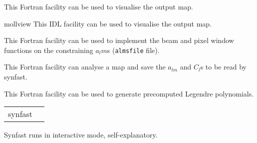 \begin{support}
  \begin{sulist}{} %
  \item[\htmlref{map2gif}{fac:map2gif}] This \healpix Fortran facility can be used to visualise the
  output map.
  \item[mollview] This \healpix IDL facility can be used to visualise the
  output map.
  \item[\htmlref{alteralm}{fac:alteralm}] This \healpix Fortran facility can be
  used to implement the beam and pixel window functions on the constraining
  $a_lm$s ({\tt almsfile} file).
  \item[\htmlref{anafast}{fac:anafast}] This \healpix Fortran facility can analyse a \healpix map and 
     	       save the $a_{lm}$ and $C_l$s to be read by synfast.
  \item[\htmlref{plmgen}{fac:plmgen}] This \healpix Fortran facility can be used to generate precomputed Legendre polynomials.
		
  \end{sulist}
\end{support}

\begin{examples}{1}
{
\begin{tabular}{ll} %
synfast  \\
\end{tabular}
}
{
Synfast runs in interactive mode, self-explanatory.
}
\end{examples}

\vfill\newpage

